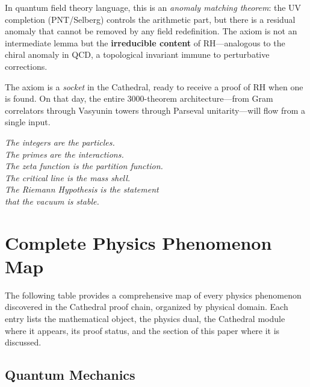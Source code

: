 \documentclass[11pt,a4paper]{article}
\begin{document}
In quantum field theory language, this is an \emph{anomaly matching
theorem}: the UV completion (PNT/Selberg) controls the arithmetic
part, but there is a residual anomaly that cannot be removed by
any field redefinition. The axiom 
is not an intermediate lemma but the \textbf{irreducible content} of
RH---analogous to the chiral anomaly in QCD, a topological invariant
immune to perturbative corrections.

The axiom is a \emph{socket} in the Cathedral, ready to receive a
proof of RH when one is found. On that day, the entire 3000-theorem
architecture---from Gram correlators through Vasyunin towers through
Parseval unitarity---will flow from a single input.

\begin{flushright}
\emph{The integers are the particles.\\
The primes are the interactions.\\
The zeta function is the partition function.\\
The critical line is the mass shell.\\
The Riemann Hypothesis is the statement\\
that the vacuum is stable.}
\end{flushright}

\appendix
\section{Complete Physics Phenomenon Map}
\label{app:phenomenon-map}

The following table provides a comprehensive map of every physics phenomenon
discovered in the Cathedral proof chain, organized by physical domain.
Each entry lists the mathematical object, the physics dual, the Cathedral
module where it appears, its proof status, and the section of this paper
where it is discussed.

\subsection{Quantum Mechanics}
\end{document}

